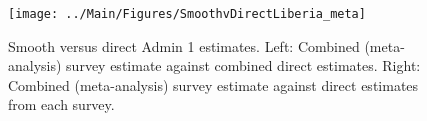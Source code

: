 \documentclass[12pt]{article}\usepackage[]{graphicx}\usepackage[]{color}
\newenvironment{knitrout}{}{} %
\begin{document}



\begin{knitrout}
\color{fgcolor}\begin{figure}[bht]

{\centering \texttt{[image: ../Main/Figures/SmoothvDirectLiberia\_meta]} 

}

\caption[Smooth versus direct Admin 1 estimates]{Smooth versus direct Admin 1 estimates. Left: Combined (meta-analysis) survey estimate against combined direct estimates. Right: Combined (meta-analysis) survey estimate against direct estimates from each survey.}\label{fig:unnamed-chunk-183}
\end{figure}


\end{knitrout}
\end{document}
